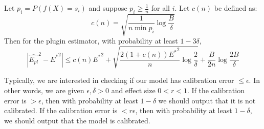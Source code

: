 \begin{theorem}
\label{thm:plugin-bound}
Let $p_i = P(f(X) = s_i)$ and suppose $p_i \geq \frac{1}{n}$ for all $i$. Let $c(n)$ be defined as:
\[ c(n) = \sqrt{\frac{1}{n \min p_i} \log{\frac{B}{\delta}}} \]
Then for the plugin estimator, with probability at least $1 - 3\delta$,
\[ | \hat{E_{pl}}^2 - {E^*}^2 | \leq c(n){E^*}^2 + \sqrt{\frac{2(1+c(n)){E^*}^2}{n} \log{\frac{2}{\delta}}} + \frac{B}{2n} \log{\frac{2B}{\delta}} \]
\end{theorem}




Typically, we are interested in checking if our model has calibration error $\leq \epsilon$. In other words, we are given $\epsilon, \delta > 0$ and effect size $0 < r < 1$. If the calibration error is $> \epsilon$, then with probability at least $1 - \delta$ we should output that it is not calibrated. If the calibration error is $< r\epsilon$, then with probability at least $1 - \delta$, we should output that the model is calibrated.

